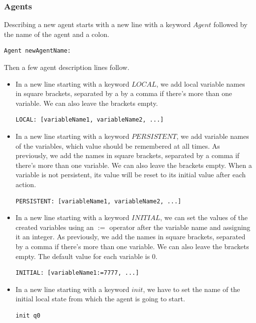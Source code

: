 \documentclass[12pt]{article}
\begin{document}
\subsubsection{Agents}
Describing a new agent starts with a new line with a keyword $Agent$ followed by the name of the agent and a colon.
\begin{lstlisting}[title={Creating an agent with a name "newAgentName".}]
  Agent newAgentName:
\end{lstlisting}
Then a few agent description lines follow.
\begin{itemize}
  \item In a new line starting with a keyword $LOCAL$, we add local variable names in square brackets, separated by a by a comma if there's more than one variable. We can also leave the brackets empty.
  \begin{lstlisting}[title={Creating local variables named "variableName1", "variableName2".}]
    LOCAL: [variableName1, variableName2, ...]
  \end{lstlisting}
  \item In a new line starting with a keyword $PERSISTENT$, we add variable names of the variables, which value should be remembered at all times. As previously, we add the names in square brackets, separated by a comma if there's more than one variable. We can also leave the brackets empty. When a variable is not persistent, its value will be reset to its initial value after each action.
  \begin{lstlisting}[title={Making local variables named "variableName1", "variableName2" and so on, persistent.}]
    PERSISTENT: [variableName1, variableName2, ...]
  \end{lstlisting}
  \item In a new line starting with a keyword $INITIAL$, we can set the values of the created variables using an $:=$ operator after the variable name and assigning it an integer. As previously, we add the names in square brackets, separated by a comma if there's more than one variable. We can also leave the brackets empty. The default value for each variable is 0.
  \begin{lstlisting}[title={Setting a value 7777 to the "variableName1" variable and so on.}]
    INITIAL: [variableName1:=7777, ...]
  \end{lstlisting}
  \item In a new line starting with a keyword $init$, we have to set the name of the initial local state from which the agent is going to start.
  \begin{lstlisting}[title={Setting the "q0" as the initial state in the local model.}]
    init q0
  \end{lstlisting}
\end{itemize}
\end{document}
